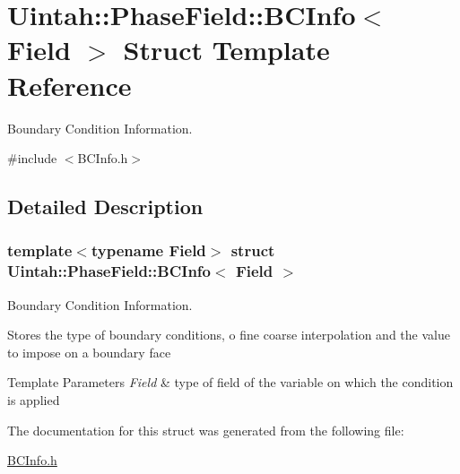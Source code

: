 \hypertarget{structUintah_1_1PhaseField_1_1BCInfo}{}\section{Uintah\+:\+:Phase\+Field\+:\+:B\+C\+Info$<$ Field $>$ Struct Template Reference}
\label{structUintah_1_1PhaseField_1_1BCInfo}


Boundary Condition Information.  




{\ttfamily \#include $<$B\+C\+Info.\+h$>$}



\subsection{Detailed Description}
\subsubsection*{template$<$typename Field$>$\newline
struct Uintah\+::\+Phase\+Field\+::\+B\+C\+Info$<$ Field $>$}

Boundary Condition Information. 

Stores the type of boundary conditions, o fine coarse interpolation and the value to impose on a boundary face


\begin{DoxyTemplParams}{Template Parameters}
{\em Field} & type of field of the variable on which the condition is applied \\
\hline
\end{DoxyTemplParams}


The documentation for this struct was generated from the following file\+:\begin{DoxyCompactItemize}
\item 
\hyperlink{BCInfo_8h}{B\+C\+Info.\+h}\end{DoxyCompactItemize}

